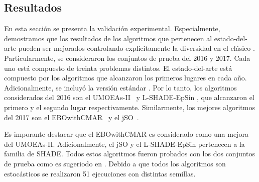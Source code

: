 \subsection{Resultados \DEEDM{} }
En esta sección se presenta la validación experimental.
%
Especialmente, demostramos que los resultados de los algoritmos que pertenecen al estado-del-arte pueden ser mejorados controlando explícitamente la diversidad en el clásico \DE{}.
%
Particularmente, se consideraron los conjuntos de prueba del \CEC{} 2016 y \CEC{} 2017.
%
Cada uno está compuesto de treinta problemas distintos.
%
El estado-del-arte está compuesto por los algoritmos que alcanzaron los primeros lugares en cada año.
%
Adicionalmente, se incluyó la versión estándar \DE{}.
%
Por lo tanto, los algoritmos considerados del \CEC{} 2016 son el UMOEAs-II~\cite{elsayed2016testing} y L-SHADE-EpSin \cite{awad2016ensemble}, que alcanzaron el primero y el segundo lugar respectivamente.
%
Similarmente, los mejores algoritmos del \CEC{} 2017 son el EBOwithCMAR~\cite{kumar2017improving} y el jSO~\cite{brest2017single}.

%
Es imporante destacar que el EBOwithCMAR es considerado como una mejora del UMOEAs-II.
%
Adicionalmente, el jSO y el L-SHADE-EpSin pertenecen a la familia de SHADE.
%
Todos estos algoritmos fueron probados con los dos conjuntos de prueba como es sugeriodo en \cite{molina2017analysis}.
Debido a que todos los algoritmos son estocásticos se realizaron 51 ejecuciones con distintas semillas.
%

